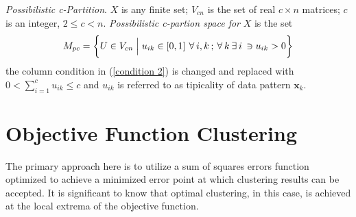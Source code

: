 \documentclass[english]{HSMW-Thesis}
\begin{document}
\begin{definition}\cite{pal2005possibilistic}
	\emph{Possibilistic c-Partition}\label{def:Possibilistic c-Partition}.\hspace{2pt} $ X $ \hspace{2pt}is any finite set;\hspace{2pt} $V_{cn}$ is the set of real\hspace{2pt} $c\times n$\hspace{2pt} matrices;\hspace{2pt} $c$\hspace{2pt} is an integer,\hspace{2pt} $2\leq c< n$.\hspace{2pt} \emph{Possibilistic c-partion space for}\hspace{2pt} $X$\hspace{2pt} is the set	
	\begin{equation}\label{Possibilistic set space}
		M_{pc}= \bigg\{ U\in V_{cn}\Bigm| u_{ik}\in \left[ 0,1\right] \hspace{2pt} \forall\hspace{2pt} i,k\hspace{2pt} ;\hspace{2pt} \forall \hspace{2pt}k\hspace{2pt} \exists\hspace{2pt} i \hspace{2pt}\ni u_{ik}> 0\bigg\}
	\end{equation}
   the column condition in (\ref{condition 2}) is changed and replaced with\hspace{2pt} $0<\sum_{i=1}^{c} u_{ik}\leq c$\hspace{2pt} and\hspace{2pt} $u_{ik}$\hspace{2pt} is referred to as tipicality of data pattern\hspace{2pt} $\mathbf{x}_k$\cite{krishnapuram1993possibilistic}.
	
\end{definition}

\chapter{Objective Function Clustering}
The primary approach here is to utilize a sum of squares errors function optimized to achieve a minimized error point at which clustering results can be accepted. It is significant to know that optimal clustering, in this case, is achieved at the local extrema of the objective function\cite{bezdek1981pattern}.
\end{document}
